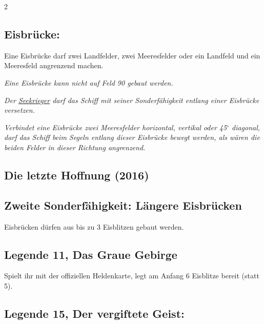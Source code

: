 \documentclass[10pt, a4paper, oneside]{book}
\newcommand{\fan}[1]{\textit{#1}}
\begin{document}
\begin{multicols*}{2}
\begin{bgcolor}
\subsection{Eisbrücke:}

Eine Eisbrücke darf zwei Landfelder, zwei Meeresfelder oder ein Landfeld und ein Meeresfeld angrenzend machen.
\supercite{MH:Begleitheft}

\fan{Eine Eisbrücke kann nicht auf Feld 90 gebaut werden.}


\fan{Der \hyperref[Seekrieger]{Seekrieger} darf das Schiff mit seiner Sonderfähigkeit entlang einer Eisbrücke versetzen.}

\fan{Verbindet eine Eisbrücke zwei Meeresfelder horizontal, vertikal oder 45$^\circ$ diagonal, darf das Schiff beim Segeln entlang dieser Eisbrücke bewegt werden, als wären die beiden Felder in dieser Richtung angrenzend.}



\end{bgcolor}





\begin{bgcolor}
\section{Die letzte Hoffnung (2016)}



\subsection{Zweite Sonderfähigkeit: Längere Eisbrücken}

Eisbrücken dürfen aus bis zu 3 Eisblitzen gebaut werden.
\supercite{MH11:Heldenkarte_Eis-Dämon}




\subsection{Legende 11, Das Graue Gebirge}

Spielt ihr mit der offiziellen Heldenkarte, legt am Anfang 6 Eisblitze bereit (statt 5).



\subsection{Legende 15, Der vergiftete Geist:}


\end{bgcolor}
\end{multicols*}
\end{document}
